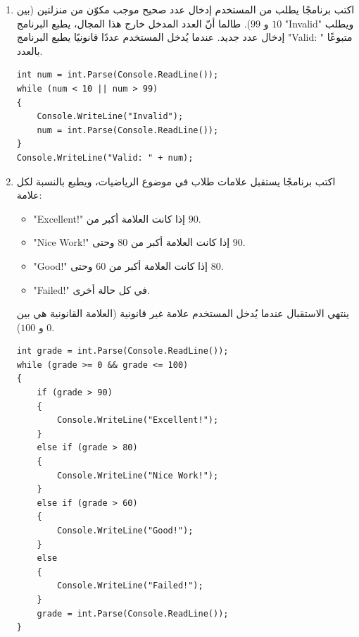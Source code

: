\documentclass[14pt]{extarticle}
\begin{document}
\begin{enumerate}[resume, itemsep=1em]
\item اكتب برنامجًا يطلب من المستخدم إدخال عدد صحيح موجب مكوّن من منزلتين (بين $10$ و $99$). طالما أنّ العدد المدخل خارج هذا المجال، يطبع البرنامج \textenglish{"Invalid"} ويطلب إدخال عدد جديد. عندما يُدخل المستخدم عددًا قانونيًا يطبع البرنامج \textenglish{"Valid: "} متبوعًا بالعدد.
\ifwithsols
\begin{boxSolution}
\begin{english}
\begin{verbatim}
int num = int.Parse(Console.ReadLine());
while (num < 10 || num > 99)
{
    Console.WriteLine("Invalid");
    num = int.Parse(Console.ReadLine());
}
Console.WriteLine("Valid: " + num);
\end{verbatim}
\end{english}
\end{boxSolution}
\fi
\filbreak

\item اكتب برنامجًا يستقبل علامات طلاب في موضوع الرياضيات، ويطبع بالنسبة لكل علامة:
\begin{itemize}[nosep]
    \item \textenglish{"Excellent!"} إذا كانت العلامة أكبر من $90$.
    \item \textenglish{"Nice Work!"} إذا كانت العلامة أكبر من $80$ وحتى $90$.
    \item \textenglish{"Good!"} إذا كانت العلامة أكبر من $60$ وحتى $80$.
    \item \textenglish{"Failed!"} في كل حالة أخرى.
\end{itemize}
ينتهي الاستقبال عندما يُدخل المستخدم علامة غير قانونية (العلامة القانونية هي بين $0$ و $100$).
\ifwithsols
\begin{boxSolution}
\begin{english}
\begin{verbatim}
int grade = int.Parse(Console.ReadLine());
while (grade >= 0 && grade <= 100)
{
    if (grade > 90)
    {
        Console.WriteLine("Excellent!");
    }
    else if (grade > 80)
    {
        Console.WriteLine("Nice Work!");
    }
    else if (grade > 60)
    {
        Console.WriteLine("Good!");
    }
    else
    {
        Console.WriteLine("Failed!");
    }
    grade = int.Parse(Console.ReadLine());
}
\end{verbatim}
\end{english}
\end{boxSolution}
\fi
\filbreak


\end{enumerate}
\end{document}
